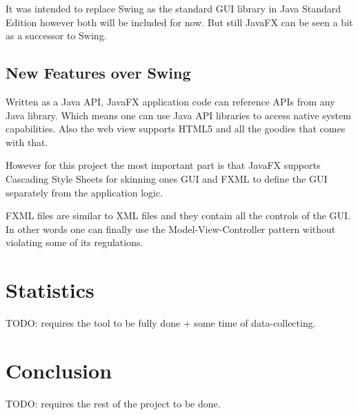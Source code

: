 It was intended to replace Swing as the standard GUI library in Java Standard Edition however both will be included for now. But still JavaFX can be seen a bit as a successor to Swing.

\section{New Features over Swing}
Written as a Java API, JavaFX application code can reference APIs from any Java library. Which means one can use Java API libraries to access native system capabilities. 
Also the web view supports HTML5 and all the goodies that comes with that.

However for this project the most important part is that JavaFX supports Cascading Style Sheets for skinning ones GUI and FXML to define the GUI separately from the application logic.

FXML files are similar to XML files and they contain all the controls of the GUI. In other words one can finally use the Model-View-Controller pattern without violating some of its regulations.

\chapter{Statistics} \label{Statistics}
TODO: requires the tool to be fully done + some time of data-collecting.

\chapter{Conclusion} \label{Conclusion}
TODO: requires the rest of the project to be done.